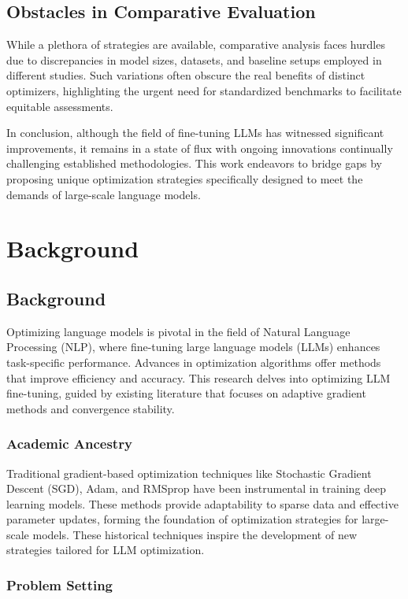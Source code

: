 \documentclass{article} %
\begin{document}
\subsection{Obstacles in Comparative Evaluation}
While a plethora of strategies are available, comparative analysis faces hurdles due to discrepancies in model sizes, datasets, and baseline setups employed in different studies. Such variations often obscure the real benefits of distinct optimizers, highlighting the urgent need for standardized benchmarks to facilitate equitable assessments.

In conclusion, although the field of fine-tuning LLMs has witnessed significant improvements, it remains in a state of flux with ongoing innovations continually challenging established methodologies. This work endeavors to bridge gaps by proposing unique optimization strategies specifically designed to meet the demands of large-scale language models.

\section{Background}
\label{sec:background}
\subsection{Background}

Optimizing language models is pivotal in the field of Natural Language Processing (NLP), where fine-tuning large language models (LLMs) enhances task-specific performance. Advances in optimization algorithms offer methods that improve efficiency and accuracy. This research delves into optimizing LLM fine-tuning, guided by existing literature that focuses on adaptive gradient methods and convergence stability.

\subsubsection{Academic Ancestry}

Traditional gradient-based optimization techniques like Stochastic Gradient Descent (SGD), Adam, and RMSprop have been instrumental in training deep learning models. These methods provide adaptability to sparse data and effective parameter updates, forming the foundation of optimization strategies for large-scale models. These historical techniques inspire the development of new strategies tailored for LLM optimization.

\subsubsection{Problem Setting}
\end{document}
